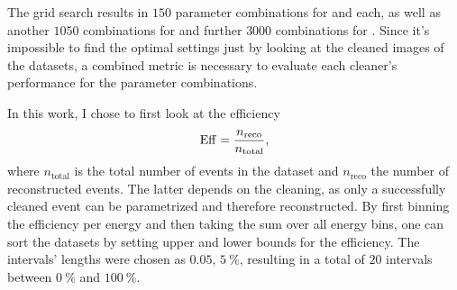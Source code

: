 
The grid search results in \(\num{150}\) parameter combinations for \tailcuts{} and \mars{} each,
as well as another \(\num{1050}\) combinations for \fact{} and further \(\num{3000}\) combinations for \tcc{}.
Since it's impossible to find the optimal settings just by looking at the
cleaned images of the datasets, a combined metric is necessary to evaluate each cleaner's performance
for the parameter combinations.

In this work, I chose to first look at the efficiency
\begin{equation}\label{eq:efficiency}
    \operatorname{Eff} =  \frac{n_{\mathrm{reco}}}{n_{\mathrm{total}}},
\end{equation}
where \(n_{\mathrm{total}}\) is the total number of events in the dataset and \(n_{\mathrm{reco}}\)
the number of reconstructed events. The latter depends on the cleaning, as only a successfully cleaned
event can be parametrized and therefore reconstructed. By first binning the efficiency per energy and then
taking the sum over all energy bins, one can sort the datasets by setting upper and lower bounds for the efficiency.
The intervals' lengths were chosen as \(\num{0.05}\), \ie \(\SI{5}{\percent}\), resulting in a total
of \(\num{20}\) intervals between \(\SI{0}{\percent}\) and \(\SI{100}{\percent}\).


